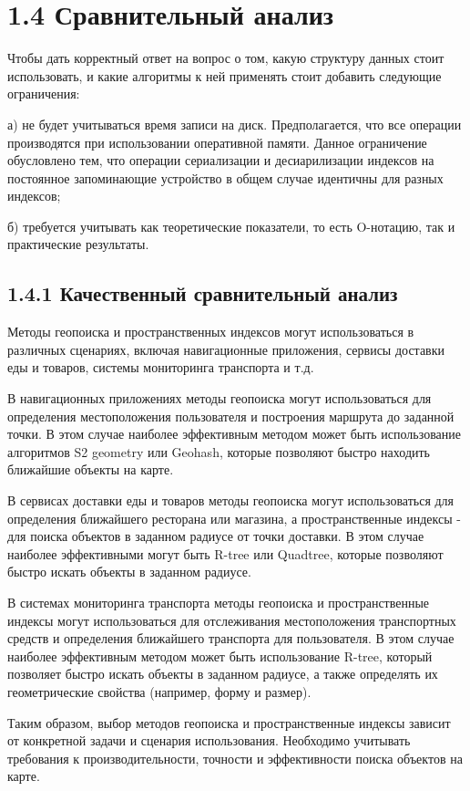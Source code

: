 \section{1.4 Сравнительный анализ}

Чтобы дать корректный ответ на вопрос о том, какую структуру данных стоит использовать, и какие алгоритмы к ней применять стоит добавить следующие ограничения:
\par а) не будет учитываться время записи на диск. Предполагается, что все операции производятся при использовании оперативной памяти. Данное ограничение обусловлено тем, что операции сериализации и десиарилизации индексов на постоянное запоминающие устройство в общем случае идентичны для разных индексов;
\par б) требуется учитывать как теоретические показатели, то есть O-нотацию, так и практические результаты.


\subsection{1.4.1 Качественный сравнительный анализ}
Методы геопоиска и пространственных индексов могут использоваться в различных сценариях, включая навигационные приложения, сервисы доставки еды и товаров, системы мониторинга транспорта и т.д.\cite{heHBase}

В навигационных приложениях методы геопоиска могут использоваться для определения местоположения пользователя и построения маршрута до заданной точки. В этом случае наиболее эффективным методом может быть использование алгоритмов S2 geometry или Geohash, которые позволяют быстро находить ближайшие объекты на карте. 

В сервисах доставки еды и товаров методы геопоиска могут использоваться для определения ближайшего ресторана или магазина, а пространственные индексы - для поиска объектов в заданном радиусе от точки доставки. В этом случае наиболее эффективными могут быть R-tree или Quadtree, которые позволяют быстро искать объекты в заданном радиусе. 

В системах мониторинга транспорта методы геопоиска и пространственные индексы могут использоваться для отслеживания местоположения транспортных средств и определения ближайшего транспорта для пользователя. В этом случае наиболее эффективным методом может быть использование R-tree, который позволяет быстро искать объекты в заданном радиусе, а также определять их геометрические свойства (например, форму и размер). 

Таким образом, выбор методов геопоиска и пространственные индексы зависит от конкретной задачи и сценария использования. Необходимо учитывать требования к производительности, точности и эффективности поиска объектов на карте. 

